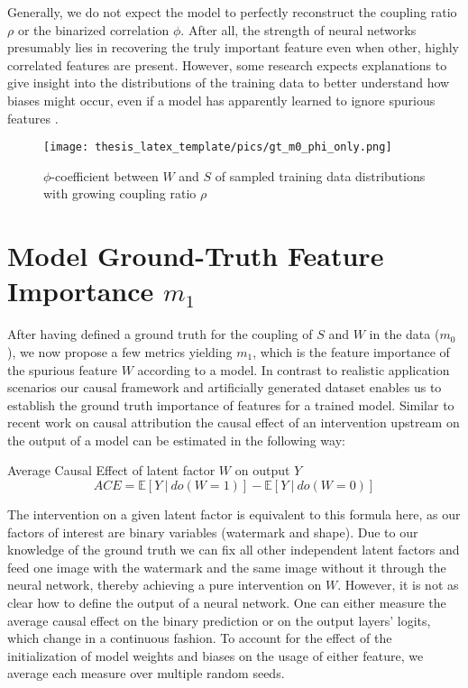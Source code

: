 Generally, we do not expect the model to perfectly reconstruct the coupling ratio $\rho$ or the binarized correlation $\phi$. After all, the strength of neural networks presumably lies in recovering the truly important feature even when other, highly correlated features are present. However, some research expects explanations to give insight into the distributions of the training data to better understand how biases might occur, even if a model has apparently learned to ignore spurious features \citep{Kindermans2017}. 

\begin{figure}[t!]
    \centering
    \texttt{[image: thesis\_latex\_template/pics/gt\_m0\_phi\_only.png]}
    \caption[True Data Distribution $m_0$]{$\phi$-coefficient between $W$ and $S$ of sampled training data distributions with growing coupling ratio $\rho$}
    \label{fig:finding_rho}
\end{figure}

\section{Model Ground-Truth Feature Importance $m_1$}\label{section:gt_measure}
After having defined a ground truth for the coupling of $S$ and $W$ in the data ($m_0$), we now propose a few metrics yielding $m_1$, which is the feature importance of the spurious feature $W$ according to a model.
In contrast to realistic application scenarios our causal framework and artificially generated dataset enables us to establish the ground truth importance of features for a trained model. Similar to recent work on causal attribution \citep{Goyal2019,Parafita2019,Karimi2023} the causal effect of an intervention upstream on the output of a model can be estimated in the following way:
\begin{center}
Average Causal Effect of latent factor $W$ on output $Y$ \\
\begin{equation}
\displaystyle ACE = \mathbb{E} [ Y \ | \ do(W=1) ] - \mathbb{E} [ Y \ | \ do(W=0) ] 
\end{equation}
\end{center}

The intervention on a given latent factor is equivalent to this formula here, as our factors of interest are binary variables (watermark and shape). Due to our knowledge of the ground truth we can fix all other independent latent factors and feed one image with the watermark and the same image without it through the neural network, thereby achieving a pure intervention on $W$.  
However, it is not as clear how to define the output of a neural network. One can either measure the average causal effect on the binary prediction or on the output layers' logits, which change in a continuous fashion.
To account for the effect of the initialization of model weights and biases on the usage of either feature, we average each measure over multiple random seeds.

